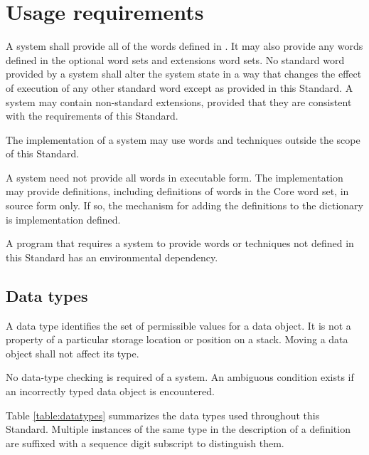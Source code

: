 \chapter{Usage requirements}
\label{usage}

A system shall provide all of the words defined in
. It may also provide any
words defined in the optional word sets and extensions word
sets. No standard word provided by a system shall alter the
system state in a way that changes the effect of execution of
any other standard word except as provided in this Standard.
A system may contain non-standard extensions, provided that
they are consistent with the requirements of this Standard.

The implementation of a system may use words and techniques
outside the scope of this Standard.

A system need not provide all words in executable form. The
implementation may provide definitions, including definitions
of words in the Core word set, in source form only. If so,
the mechanism for adding the definitions to the dictionary
is implementation defined.

A program that requires a system to provide words or techniques
not defined in this Standard has an environmental dependency.

\section{Data types} %
\label{usage:data}

A data type identifies the set of permissible values for a
data object. It is not a property of a particular storage
location or position on a stack. Moving a data object shall
not affect its type.

No data-type checking is required of a system. An ambiguous
condition exists if an incorrectly typed data object is
encountered.

Table \ref{table:datatypes} summarizes the data types used
throughout this Standard. Multiple instances of the same
type in the description of a definition are suffixed with
a sequence digit subscript to distinguish them.

